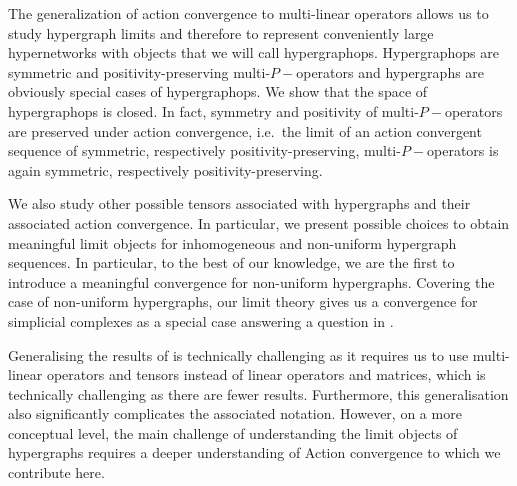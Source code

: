 \documentclass[11pt]{article}
\begin{document}
The generalization of action convergence to multi-linear operators allows us to study hypergraph limits and therefore to represent conveniently large hypernetworks with objects that we will call hypergraphops. Hypergraphops are symmetric and positivity-preserving multi-$P-$operators and hypergraphs are obviously special cases of hypergraphops. We show that the space of hypergraphops is closed. In fact, symmetry and positivity of multi-$P-$operators are preserved under action convergence, i.e.\ the limit of an action convergent sequence of symmetric, respectively positivity-preserving, multi-$P-$operators is again symmetric, respectively positivity-preserving.

We also study other possible tensors associated with hypergraphs and their associated action convergence. In particular, we present possible choices to obtain meaningful limit objects for inhomogeneous and non-uniform hypergraph sequences. In particular, to the best of our knowledge, we are the first to introduce a meaningful convergence for non-uniform hypergraphs. Covering the case of non-uniform hypergraphs, our limit theory gives us a convergence for simplicial complexes as a special case answering a question in \cite{Bobrowski2022}.

Generalising the results of \cite{backhausz2018action} is technically challenging as it requires us to use multi-linear operators and tensors instead of linear operators and matrices, which is technically challenging as there are fewer results. Furthermore, this generalisation also significantly complicates the associated notation. However, on a more conceptual level, the main challenge of understanding the limit objects of hypergraphs requires a deeper understanding of Action convergence to which we contribute here.
\end{document}
